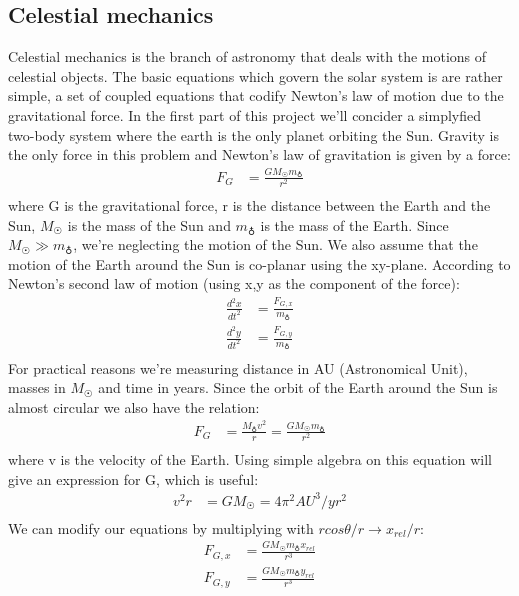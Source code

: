 \documentclass{article}
\begin{document}
\subsection{Celestial mechanics}
Celestial mechanics is the branch of astronomy that deals with the motions of celestial objects. The basic equations which govern the solar system is are rather simple, a set of coupled equations that codify Newton's law of motion due to the gravitational force. In the first part of this project we'll concider a simplyfied two-body system where the earth is the only planet orbiting the Sun. Gravity is the only force in this problem and Newton's law of gravitation is given by a force:
\begin{align*}
  F_G &= \frac{GM_{\astrosun}m_{\earth}}{r^2}\\
\end{align*}
where G is the gravitational force, r is the distance between the Earth and the Sun, $M_{\astrosun}$ is the mass of the Sun and $m_{\earth}$ is the mass of the Earth. Since $M_{\astrosun} \gg m_{\earth}$, we're neglecting the motion of the Sun. We also assume that the motion of the Earth around the Sun is co-planar using the xy-plane.
According to Newton's second law of motion (using x,y as the component of the force):
\begin{align*}
  \frac{d^2x}{dt^2} &= \frac{F_{G,x}}{m_{\earth}}\\
  \frac{d^2y}{dt^2} &= \frac{F_{G,y}}{m_{\earth}}\\
\end{align*}
For practical reasons we're measuring distance in AU (Astronomical Unit), masses in $M_{\astrosun}$ and time in years.
Since the orbit of the Earth around the Sun is almost circular we also have the relation:
\begin{align*}
  F_{G} &= \frac{M_{\earth}v^2}{r} = \frac{GM_{\astrosun}m_{\earth}}{r^2}\\
\end{align*}
where v is the velocity of the Earth.
Using simple algebra on this equation will give an expression for G, which is useful:
\begin{align*}
  v^2 r &= GM_{\astrosun} = 4\pi^2 AU^3/yr^2\\
\end{align*}
We can modify our equations by multiplying with $r cos\theta/r\to x_{rel}/r$:
\begin{align*}
  F_{G,x} &= \frac{GM_{\astrosun}m_{\earth} x_{rel}}{r^3}\\
  F_{G,y} &= \frac{GM_{\astrosun}m_{\earth} y_{rel}}{r^3}\\
\end{align*}
\end{document}
